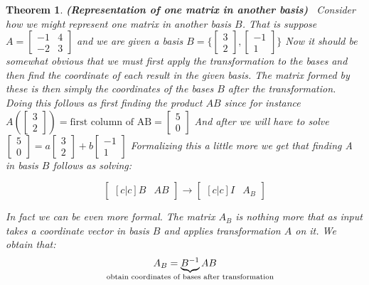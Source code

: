 \documentclass[titlepage]{article}
\newtheorem{thm}{Theorem}[subsection]
\numberwithin{equation}{subsection}
\begin{document}
\begin{thm}\textbf{(Representation of one matrix in another basis)}
\
Consider how we might represent one matrix in another basis $B$. That is suppose $A = \begin{bmatrix}
    -1 & 4 \\
    -2 & 3
\end{bmatrix}$ and we are given a basis $B = \{ \begin{bmatrix}
    3 \\
    2
\end{bmatrix}, \begin{bmatrix}
    -1 \\ 
    1
\end{bmatrix} \}$ Now it should be somewhat obvious that we must first apply the transformation to the bases and then find the coordinate of each result in the given basis. The matrix formed by these is then simply the coordinates of the bases $B$ after the transformation. Doing this follows as first finding the product $AB$ since for instance $A(\begin{bmatrix}
    3 \\
    2
\end{bmatrix}) = \text{first column of AB} = \begin{bmatrix}
    5 \\ 
    0
\end{bmatrix}$ And after we will have to solve $\begin{bmatrix}
    5 \\
    0
\end{bmatrix} = a \begin{bmatrix}
    3 \\ 
    2
\end{bmatrix} + b\begin{bmatrix}
    -1 \\ 
    1
\end{bmatrix}$ Formalizing this a little more we get that finding A in basis $B$ follows as solving:

$$\begin{bmatrix}[c|c]
    B & AB
\end{bmatrix} \rightarrow \begin{bmatrix}[c|c]
    I & A_{B}
\end{bmatrix}$$

In fact we can be even more formal. The matrix $A_B$ is nothing more that as input takes a coordinate vector in basis $B$ and applies transformation $A$ on it. We obtain that:
$$A_{B} = \underbrace{B^{-1}}_{\text{\makebox[0pt]{obtain coordinates of bases after transformation}}}AB$$

\end{thm}
\end{document}
